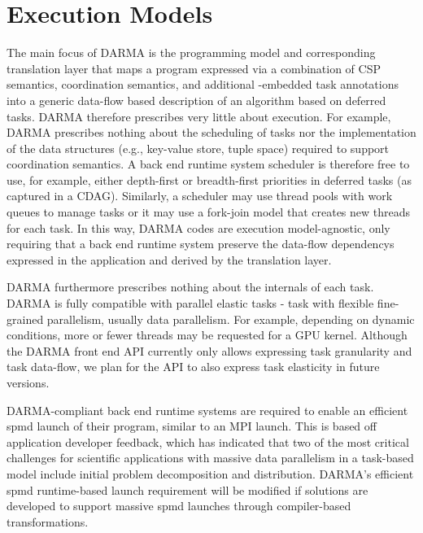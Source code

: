 

\section{Execution Models}
\label{sec:exec_model}
The main focus of \gls{DARMA} is the \gls{programming model} and corresponding
\gls{translation layer} that maps a program expressed via a combination of
\gls{CSP} semantics, \gls{coordination semantics}, and additional \CC{}-embedded task annotations into a generic data-flow based
description of an algorithm based on \glspl{deferred task}.
\gls{DARMA} therefore prescribes very little about execution.
For example, \gls{DARMA} prescribes nothing about the scheduling of \glspl{task} nor the implementation 
of the data structures (e.g., \gls{key-value store}, \gls{tuple space}) required to support \gls{coordination semantics}.
A \gls{back end} \gls{runtime system} scheduler is therefore free to use, for example,
either depth-first or breadth-first priorities in deferred tasks (as captured
in a \gls{CDAG}).
Similarly, a scheduler may use \glspl{thread pool} with work queues to manage
tasks or it may use a \gls{fork-join} model that creates new threads for each task.
In this way, \gls{DARMA} codes are \gls{execution model}-agnostic, only
requiring that a \gls{back end} \gls{runtime system} preserve the
\glspl{data-flow dependency} expressed in the application and derived by the
\gls{translation layer}.

\gls{DARMA} furthermore prescribes nothing about the internals of each \gls{task}.
\gls{DARMA} is fully compatible with parallel \glspl{elastic task} - \gls{task}
with flexible fine-grained parallelism, usually \gls{data parallelism}.
For example, depending on dynamic conditions, more or fewer threads may be requested for a GPU kernel.
Although the \gls{DARMA} \gls{front end} \gls{API} currently only allows expressing task granularity and task data-flow,
we plan for the \gls{API} to also express \gls{task elasticity} in future versions.

\gls{DARMA}-compliant \gls{back end} \glspl{runtime system} are required to enable an efficient
\gls{spmd} launch of their program, similar to an MPI launch.
This is based off application developer feedback, which has indicated that 
two of the most critical challenges for scientific applications with massive
\gls{data parallelism} in a task-based model
include initial problem decomposition and distribution.
\gls{DARMA}'s efficient \gls{spmd} runtime-based launch requirement 
will be modified if solutions are developed to support massive \gls{spmd} launches
through compiler-based transformations.

